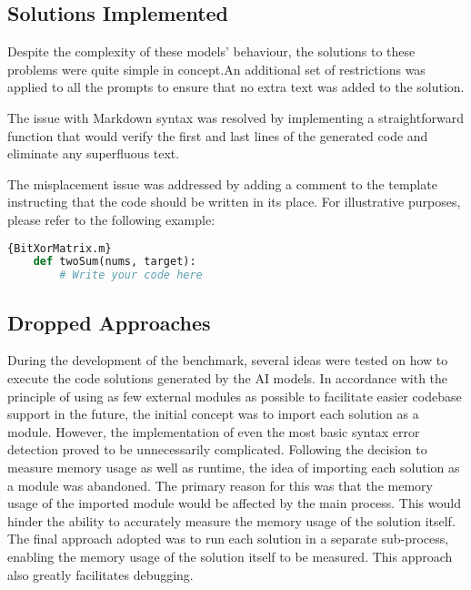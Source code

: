 \subsection{Solutions Implemented}

Despite the complexity of these models' behaviour, the solutions to these problems were quite simple in concept.An additional set of restrictions was applied to all the prompts to ensure that no extra text was added to the solution.

The issue with Markdown syntax was resolved by implementing a straightforward function that would verify the first and last lines of the generated code and eliminate any superfluous text.

The misplacement issue was addressed by adding a comment to the template instructing that the code should be written in its place. For illustrative purposes, please refer to the following example:
\begin{lstlisting}[language=Python]{BitXorMatrix.m}
    def twoSum(nums, target):
        # Write your code here
        \end{lstlisting}
    

\subsection{Dropped Approaches}

During the development of the benchmark, several ideas were tested on how to execute the code solutions generated by the AI models. In accordance with the principle of using as few external modules as possible to facilitate easier codebase support in the future, the initial concept was to import each solution as a module. However, the implementation of even the most basic syntax error detection proved to be unnecessarily complicated. Following the decision to measure memory usage as well as runtime, the idea of importing each solution as a module was abandoned. The primary reason for this was that the memory usage of the imported module would be affected by the main process. This would hinder the ability to accurately measure the memory usage of the solution itself. The final approach adopted was to run each solution in a separate sub-process, enabling the memory usage of the solution itself to be measured. This approach also greatly facilitates debugging.















